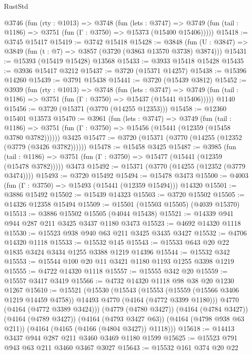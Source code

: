 \begin{lexlean}{RustStd}
\begin{coremodule}
  @3746
    (fun (rty : @1013) =>
    @3748
      (fun (lets : @3747) =>
      @3749 (fun (tail : @1186) => @3751 (fun (Γ : @3750) => @15373 (@15400 @15406)))))
@15418 := @3745 @15417
@15419 := @3742 @15418
@15428 := @3848
    (fun (U : @3847) => @3849 (fun (t : @7) => @3857 (@3720 (@3863 @13570 @3738) @3874)))
@15431 := @15393 (@15419 @15428) @13568
@15433 := @3933 @15418 @15428
@15435 := @3936 @15417 @3212
@15437 := @3720 (@15371 @14257)
@15438 := @15396 @14260
@15439 := @3791 @15438
@15441 := @3720 (@15439 @3812)
@15452 := @3939
    (fun (rty : @1013) =>
    @3748
      (fun (lets : @3747) =>
      @3749 (fun (tail : @1186) => @3751 (fun (Γ : @3750) => @15437 (@15441 @15406)))))
    @1140
@15456 := @3720 (@15371 (@3770 (@14255 @12353)))
@15458 := @12360 @15401 @13573
@15470 := @3961
    (fun (lets : @3747) =>
    @3749
      (fun (tail : @1186) =>
      @3751 (fun (Γ : @3750) => @15456 (@15441 (@12359 (@15458 @3780 @3782))))))
    @3425
@15477 := @3720 (@15371 (@3770 (@14255 (@12352 (@3779 (@3426 @3782))))))
@15478 := @15458 @3425
@15487 := @3985
    (fun (tail : @1186) => @3751 (fun (Γ : @3750) => @15477 (@15441 (@12359 (@15478 @3782)))))
    @3473
@15492 := @15371 (@3770 (@14255 (@12352 (@3779 @3474))))
@15493 := @3720 @15492
@15494 := @15478 @3473
@15500 := @4003 (fun (Γ : @3750) => @15493 (@15441 (@12359 @15494))) @14320
@15501 := @3886 @15492
@15502 := @15439 @14323
@15503 := @3720 @15502
@15505 := @14326 @12358 @15494
@15509 := @15501 (@15503 @15505) (@4039 @15370)
@15513 := @3886 @15502 @15505 (@4044 @15438)
@15521 := @14339 @941 @944 @287 @211 @3425 @3437 @1180 @3473
@15523 := @4692 @14320 @1118
@15530 := @15523 @938 @940 @63 @211 @3425 @3435 @3427
@15532 := @4706 @14320 @1118
@15533 := @15532 @145
@15543 := @15533 @643 @20 @22 @1835 @3424 @3434 @1255 @3388 @1219 @14396
@15544 := @15532 @342
@15553 := @15544 @100 @20 @11 @3421 @1180 @1193 @1255 @3398 @1219
@15555 := @4722 @14320 @1118
@15557 := @15555 @342 @20
@15559 := @15557 @3417 @3419
@15566 := @4732 @14320 @1118 @98 @38 @20 @1230 @1267
@15610 := @15521
    (@15530
      (@15543
        (@15553 (@15559 (@15566 @3406 @1219 @14459 @4758)) @14493 @4770 (@4164 (@4772 @3399 @1180)))
        @4770
        (@4164 (@4772 @3389 @3424)))
      (@4779 (@4780 @3427))
      (@4164 (@4784 @3427))
      (@4164 (@4789 @3427))
      (@4164 (@4793 @3427 @63))
      (@4164 (@4798 @938 @63 @211))
      (@4164 (@4165 (@4166 (@4804 @3427)) @1118)))
@15618 := @14413 @3437 @944 @287 @211 @3460 @3469 @1180 @1599
@15625 := @15523 @791 @943 @63 @211 @3460 @3467 @3027
@15643 := @15532
    @161
    @374
    @20
    @22

\end{coremodule}
\end{lexlean}
